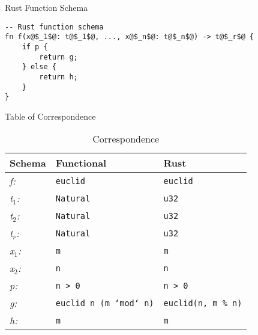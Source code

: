 \documentclass[12pt,t]{beamer}
\begin{document}
\begin{frame}[fragile]{Rust Function Schema}
\begin{center}
\vfill
\begin{verbatim}
-- Rust function schema
fn f(x@$_1$@: t@$_1$@, ..., x@$_n$@: t@$_n$@) -> t@$_r$@ {
    if p {
        return g;
    } else {
        return h;
    }
}
\end{verbatim}
\vfill
\end{center}
\end{frame}

\begin{frame}{Table of Correspondence}
\begin{center}
\vfill
\begin{table}[h]
    \centering
    \renewcommand{\arraystretch}{1.0}
    \begin{tabular}{|l|l|l|}
        \toprule
        \textbf{Schema}    & \textbf{Functional}                & \textbf{Rust}                            \\
        \midrule
        \emph{f:}        & \texttt{euclid}                    & \texttt{euclid}                          \\
        \emph{t$_1$:}       & \texttt{Natural}                   & \texttt{u32}                             \\
        \emph{t$_2$:}       & \texttt{Natural}                   & \texttt{u32}                             \\
        \emph{t$_r$:}       & \texttt{Natural}                   & \texttt{u32}                             \\
        \emph{x$_1$:}       & \texttt{m}                         & \texttt{m}                               \\
        \emph{x$_2$:}       & \texttt{n}                         & \texttt{n}                               \\
        \midrule
        \emph{p:}       & \texttt{n > 0}                   & \texttt{n > 0}                             \\
        \emph{g:}       & \texttt{euclid n (m `mod` n)}                         & \texttt{euclid(n, m \% n)}                               \\
        \emph{h:}       & \texttt{m}                         & \texttt{m}                               \\
        \bottomrule
    \end{tabular}
    \caption{Correspondence}
\end{table}
\vfill
\end{center}
\end{frame}
\end{document}
